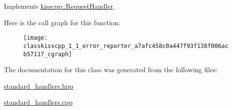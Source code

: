 Implements \hyperlink{classkisscpp_1_1_request_handler_a3606f772c07297826847a8e36226cdaa}{kisscpp\-::\-Request\-Handler}.



Here is the call graph for this function\-:
\nopagebreak
\begin{figure}[H]
\begin{center}
\leavevmode
\texttt{[image: classkisscpp\_1\_1\_error\_reporter\_a7afc458c0a447f93f138f006acb57117\_cgraph]}
\end{center}
\end{figure}




The documentation for this class was generated from the following files\-:\begin{DoxyCompactItemize}
\item 
\hyperlink{standard__handlers_8hpp}{standard\-\_\-handlers.\-hpp}\item 
\hyperlink{standard__handlers_8cpp}{standard\-\_\-handlers.\-cpp}\end{DoxyCompactItemize}
